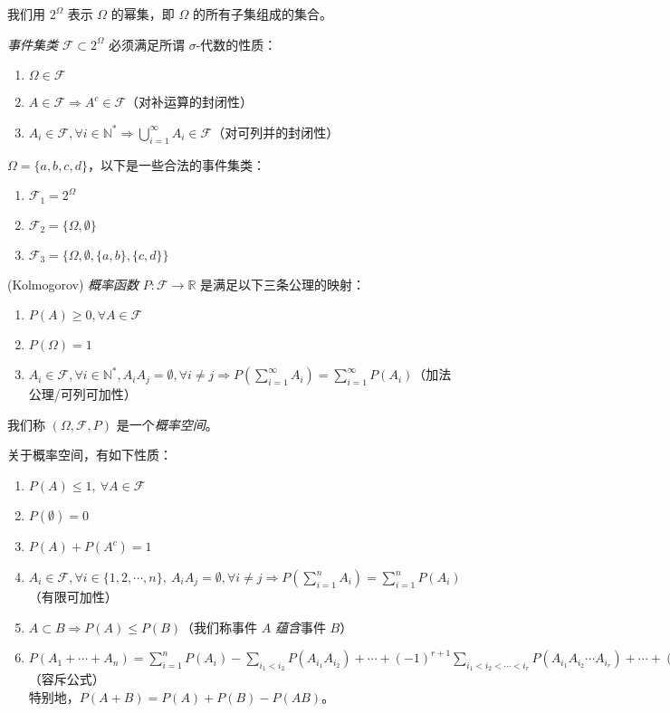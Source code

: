 \documentclass[../main.tex]{subfiles}
\begin{document}
我们用 $2^\Omega$ 表示 $\Omega$ 的幂集，即 $\Omega$ 的所有子集组成的集合。

\begin{definition}\label{def:1.5.1}
\emph{事件集类} $\mathcal{F}\subset 2^\Omega$ 必须满足所谓 $\sigma$-代数的性质：
\begin{enumerate}
    \item $\Omega\in\mathcal{F}$
    \item $A\in\mathcal{F}\Rightarrow A^c\in\mathcal{F}$（对补运算的封闭性）
    \item $A_i\in\mathcal{F},\forall i\in\mathbb{N}^*\Rightarrow \bigcup_{i=1}^\infty A_i\in\mathcal{F}$（对可列并的封闭性）
\end{enumerate}
\end{definition}

\begin{example}
$\Omega=\{a,b,c,d\}$，以下是一些合法的事件集类：
\begin{enumerate}
    \item $\mathcal{F}_1=2^\Omega$
    \item $\mathcal{F}_2=\{\Omega,\emptyset\}$
    \item $\mathcal{F}_3=\{\Omega,\emptyset,\{a,b\},\{c,d\}\}$
\end{enumerate}
\end{example}

\begin{definition}\label{def:1.5.2}
(Kolmogorov) \emph{概率函数} $P:\mathcal{F}\rightarrow\mathbb{R}$ 是满足以下三条公理的映射：
\begin{enumerate}
    \item $P(A)\geq 0,\forall A\in\mathcal{F}$
    \item $P(\Omega)=1$
    \item $A_i\in\mathcal{F},\forall i\in\mathbb{N}^*,A_iA_j=\emptyset,\forall i\neq j\Rightarrow P(\sum_{i=1}^\infty A_i)=\sum_{i=1}^\infty P(A_i)$（加法公理/可列可加性）
\end{enumerate}
我们称 $(\Omega,\mathcal{F},P)$ 是一个\emph{概率空间}。
\end{definition}

\begin{proposition}
关于概率空间，有如下性质：
\begin{enumerate}
    \item $P(A)\leq 1,\ \forall A\in\mathcal{F}$
    \item $P(\emptyset)=0$
    \item $P(A)+P(A^c)=1$
    \item $A_i\in\mathcal{F},\forall i\in\{1,2,\cdots,n\},\ A_iA_j=\emptyset,\forall i\neq j\Rightarrow P(\sum_{i=1}^n A_i)=\sum_{i=1}^n P(A_i)$（有限可加性）
    \item $A\subset B\Rightarrow P(A)\leq P(B)$（我们称事件 $A$ \emph{蕴含}事件 $B$）
    \item $P(A_1+\cdots+A_n)=\sum_{i=1}^n P(A_i)-\sum_{i_1<i_2}P(A_{i_1}A_{i_2})+\cdots+(-1)^{r+1}\sum_{i_1<i_2<\cdots<i_r}P(A_{i_1}A_{i_2}\cdots A_{i_r})+\cdots+(-1)^{n+1}P(A_1\cdots A_n)$（容斥公式）
    \\特别地，$P(A+B)=P(A)+P(B)-P(AB)$。
\end{enumerate}
\end{proposition}
\end{document}
